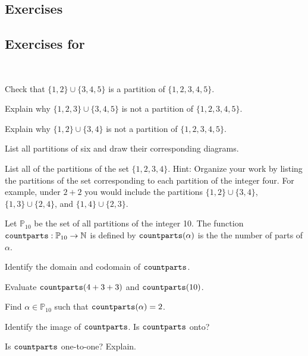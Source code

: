 
\subsection{Exercises}

\subsection*{Exercises for \subdefnpartition}


\begin{exer}[\exerP] %
\label{exer_partitions_set}
~
   \begin{exerpart}
       \item Check that $\{1,2\} \cup \{3,4,5\}$ is a partition of $\{1,2,3,4,5\}$.
       \item Explain why $\{1,2,3\} \cup \{3,4,5\}$ is not a partition of $\{1,2,3,4,5\}$.
       \item Explain why $\{1,2\} \cup \{3,4\}$ is not a partition of $\{1,2,3,4,5\}$.
   \end{exerpart}
\end{exer}

\begin{exer}[\exerP] %
\label{exer_partitions6}
    List all partitions of six and draw their corresponding diagrams.
\end{exer}

\begin{exer}[\exerU] %
\label{exer_partitions_set1234}
    List all of the partitions of the set $\{1,2,3,4\}$.  Hint: Organize your work by listing the partitions of the set corresponding to each partition of the integer four.  For example, under $2+2$ you would include the partitions $\{1,2\} \cup \{3,4\}$, $\{1,3\} \cup \{2,4\}$, and $\{1,4\} \cup \{2,3\}$.
\end{exer}

\begin{exer}[\exerU] %
\label{exer_count_parts_fn}
    Let $\mathbb{P}_{10}$ be the set of all partitions of the integer 10. The function $\texttt{countparts}:\mathbb{P}_{10} \to \mathbb{N}$ is defined by $\texttt{countparts}(\alpha)$ is the the number of parts of $\alpha$. 
        \begin{exerpart} 
            \item Identify the domain and codomain of $\texttt{countparts}$.
            \item Evaluate $\texttt{countparts}(4+3+3)$ and $\texttt{countparts}(10)$.
            \item Find $\alpha \in \mathbb{P}_{10}$ such that  $\texttt{countparts}(\alpha)=2$.
            \item Identify the image of $\texttt{countparts}$.  Is $\texttt{countparts}$ onto?
            \item Is $\texttt{countparts}$ one-to-one? Explain.
        \end{exerpart}
\end{exer}

